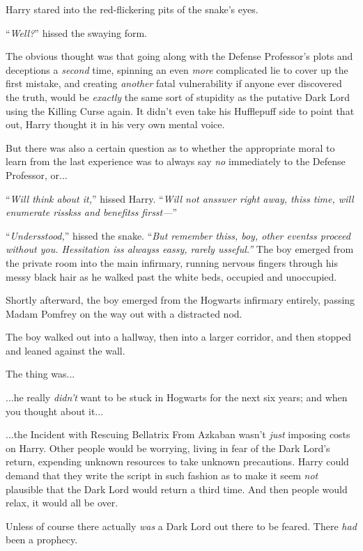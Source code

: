 Harry stared into the red-flickering pits of the snake’s eyes.

“\emph{Well?}” hissed the swaying form.

The obvious thought was that going along with the Defense Professor’s plots and deceptions a \emph{second} time, spinning an even \emph{more} complicated lie to cover up the first mistake, and creating \emph{another} fatal vulnerability if anyone ever discovered the truth, would be \emph{exactly} the same sort of stupidity as the putative Dark Lord using the Killing Curse again. It didn’t even take his Hufflepuff side to point that out, Harry thought it in his very own mental voice.

But there was also a certain question as to whether the appropriate moral to learn from the last experience was to always say \emph{no} immediately to the Defense Professor, or...

“\emph{Will think about it,}” hissed Harry. “\emph{Will not ansswer right away, thiss time, will enumerate risskss and benefitss firsst—}”

“\emph{Undersstood,}” hissed the snake. “\emph{But remember thiss, boy, other eventss proceed without you. Hessitation iss alwayss eassy, rarely usseful.”}
\sbreak
The boy emerged from the private room into the main infirmary, running nervous fingers through his messy black hair as he walked past the white beds, occupied and unoccupied.

Shortly afterward, the boy emerged from the Hogwarts infirmary entirely, passing Madam Pomfrey on the way out with a distracted nod.

The boy walked out into a hallway, then into a larger corridor, and then stopped and leaned against the wall.

The thing was...

...he really \emph{didn’t} want to be stuck in Hogwarts for the next six years; and when you thought about it...

...the Incident with Rescuing Bellatrix From Azkaban wasn’t \emph{just} imposing costs on Harry. Other people would be worrying, living in fear of the Dark Lord’s return, expending unknown resources to take unknown precautions. Harry could demand that they write the script in such fashion as to make it seem \emph{not} plausible that the Dark Lord would return a third time. And then people would relax, it would all be over.

Unless of course there actually \emph{was} a Dark Lord out there to be feared. There \emph{had} been a prophecy.


